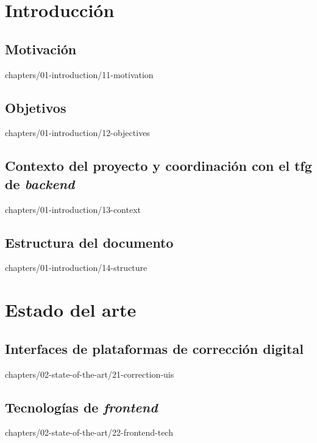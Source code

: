 \documentclass[epsbased,tfg,covers,final,printable,extendedindex,%
               firstnumbered,lof,lot,loc]{tfgtfmthesisuam}
\begin{document}

\chapter{Introducción\label{CAP:INTRODUCTION}}
  \section{Motivación\label{SEC:INTRO-MOTIVATION}}%
          {chapters/01-introduction/11-motivation}
  \section{Objetivos\label{SEC:INTRO-OBJECTIVES}}%
          {chapters/01-introduction/12-objectives}
  \section[Contexto y coordinación con el TFG de backend]%
          {Contexto del proyecto y coordinación con el \acs{tfg} de
           \textit{backend}\label{SEC:INTRO-CONTEXT}}%
          {chapters/01-introduction/13-context}
  \section{Estructura del documento\label{SEC:INTRO-STRUCTURE}}%
          {chapters/01-introduction/14-structure}

\chapter{Estado del arte\label{CAP:STATE-OF-THE-ART}}
  \section[Interfaces de plataformas de corrección]%
          {Interfaces de plataformas de corrección digital\label{SEC:SOTA-UI}}%
          {chapters/02-state-of-the-art/21-correction-uis}
  \section{Tecnologías de \textit{frontend}\label{SEC:SOTA-TECH}}%
          {chapters/02-state-of-the-art/22-frontend-tech}
\end{document}
